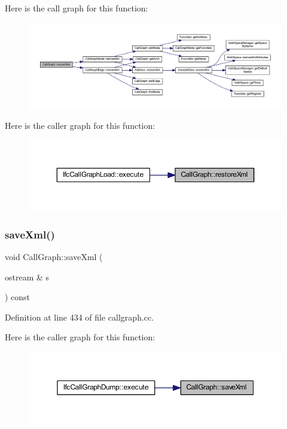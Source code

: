 Here is the call graph for this function\+:
\nopagebreak
\begin{figure}[H]
\begin{center}
\leavevmode
\includegraphics[width=350pt]{class_call_graph_ac92fb04f41917974663c5e92d46e51a5_cgraph}
\end{center}
\end{figure}
Here is the caller graph for this function\+:
\nopagebreak
\begin{figure}[H]
\begin{center}
\leavevmode
\includegraphics[width=350pt]{class_call_graph_ac92fb04f41917974663c5e92d46e51a5_icgraph}
\end{center}
\end{figure}
\mbox{\label{class_call_graph_a4b5c78fa8c1942020bac287c81f8f56d}} 
\subsubsection{\texorpdfstring{saveXml()}{saveXml()}}
{\footnotesize\ttfamily void Call\+Graph\+::save\+Xml (\begin{DoxyParamCaption}\item[{ostream \&}]{s }\end{DoxyParamCaption}) const}



Definition at line 434 of file callgraph.\+cc.

Here is the caller graph for this function\+:
\nopagebreak
\begin{figure}[H]
\begin{center}
\leavevmode
\includegraphics[width=350pt]{class_call_graph_a4b5c78fa8c1942020bac287c81f8f56d_icgraph}
\end{center}
\end{figure}


